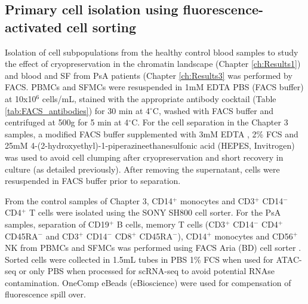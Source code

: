 \subsection{Primary cell isolation using fluorescence-activated cell sorting}
Isolation of cell subpopulations from the healthy control blood samples to study the effect of cryopreservation in the chromatin landscape (Chapter \ref{ch:Results1}) and blood and SF from PsA patients (Chapter \ref{ch:Results3} was performed by FACS. PBMCs and SFMCs were resuspended in 1mM EDTA PBS (FACS buffer) at 10x10$^6$ cells/mL, stained with the appropriate antibody cocktail (Table \ref{tab:FACS_antibodies}) for 30 min at 4{$^\circ$}C, washed with FACS buffer and centrifuged at 500g for 5 min at 4{$^\circ$}C. For the cell separation in the Chapter 3 samples, a modified FACS buffer supplemented with 3mM EDTA , 2\% FCS and 25mM 4-(2-hydroxyethyl)-1-piperazineethanesulfonic acid (HEPES, Invitrogen) was used to avoid cell clumping after cryopreservation and short recovery in culture (as detailed previously). After removing the supernatant, cells were resuspended in FACS buffer prior to separation. 

From the control samples of Chapter 3, CD14$^{+}$ monocytes and CD3$^+$ CD14$^{-}$ CD4$^{+}$ T cells were isolated using the SONY SH800 cell sorter. For the PsA samples, separation of  CD19$^+$ B cells, memory T cells (CD3$^+$ CD14$^-$ CD4$^+$ CD45RA$^{-}$ and CD3$^+$ CD14$^-$ CD8$^+$ CD45RA$^-$), CD14$^+$ monocytes and CD56$^+$ NK from PBMCs and SFMCs was performed using FACS Aria (BD) cell sorter . Sorted cells were collected in 1.5mL tubes in PBS 1\% FCS when used for ATAC-seq or only PBS when processed for scRNA-seq to avoid potential RNAse contamination. OneComp eBeads (eBioscience) were used for compensation of fluorescence spill over.


